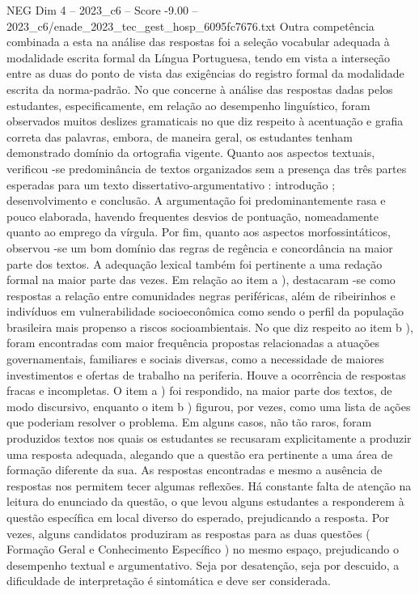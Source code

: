 \begin{textsample}{NEG Dim 4 – 2023\_c6 – Score -9.00 – 2023\_c6/enade\_2023\_tec\_gest\_hosp\_6095fc7676.txt}
Outra competência combinada a esta na análise das respostas foi a seleção vocabular adequada à modalidade escrita formal da Língua Portuguesa, tendo em vista a interseção entre as duas do ponto de vista das exigências do registro formal da modalidade escrita da norma-padrão.
No que concerne à análise das respostas dadas pelos estudantes, especificamente, em relação ao desempenho linguístico, foram observados muitos deslizes gramaticais no que diz respeito à acentuação e grafia correta das palavras, embora, de maneira geral, os estudantes tenham demonstrado domínio da ortografia vigente.
Quanto aos aspectos textuais, verificou -se predominância de textos organizados sem a presença das três partes esperadas para um texto dissertativo-argumentativo : introdução ; desenvolvimento e conclusão.
A argumentação foi predominantemente rasa e pouco elaborada, havendo frequentes desvios de pontuação, nomeadamente quanto ao emprego da vírgula.
Por fim, quanto aos aspectos morfossintáticos, observou -se um bom domínio das regras de regência e concordância na maior parte dos textos.
A adequação lexical também foi pertinente a uma redação formal na maior parte das vezes.
Em relação ao item a ), destacaram -se como respostas a relação entre comunidades negras periféricas, além de ribeirinhos e indivíduos em vulnerabilidade socioeconômica como sendo o perfil da população brasileira mais propenso a riscos socioambientais.
No que diz respeito ao item b ), foram encontradas com maior frequência propostas relacionadas a atuações governamentais, familiares e sociais diversas, como a necessidade de maiores investimentos e ofertas de trabalho na periferia.
Houve a ocorrência de respostas fracas e incompletas.
O item a ) foi respondido, na maior parte dos textos, de modo discursivo, enquanto o item b ) figurou, por vezes, como uma lista de ações que poderiam resolver o problema.
Em alguns casos, não tão raros, foram produzidos textos nos quais os estudantes se recusaram explicitamente a produzir uma resposta adequada, alegando que a questão era pertinente a uma área de formação diferente da sua.
As respostas encontradas e mesmo a ausência de respostas nos permitem tecer algumas reflexões.
Há constante falta de atenção na leitura do enunciado da questão, o que levou alguns estudantes a responderem à questão específica em local diverso do esperado, prejudicando a resposta.
Por vezes, alguns candidatos produziram as respostas para as duas questões ( Formação Geral e Conhecimento Específico ) no mesmo espaço, prejudicando o desempenho textual e argumentativo.
Seja por desatenção, seja por descuido, a dificuldade de interpretação é sintomática e deve ser considerada.

\end{textsample}
